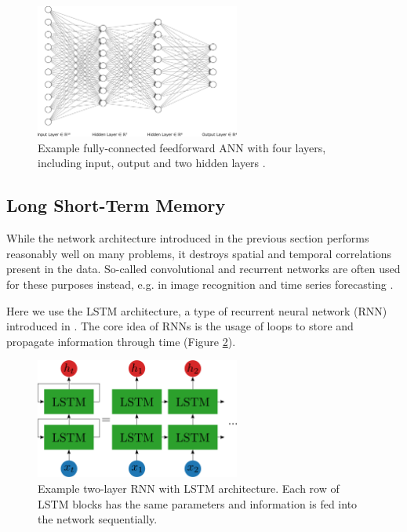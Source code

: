 \begin{figure}
	\centering
	\includegraphics[width=0.6\textwidth]{img/nn}
	\caption{Example fully-connected feedforward ANN with four layers, including input, output and two hidden layers \cite{LeNail2019}.}
	\label{nn}
\end{figure}

\subsection{Long Short-Term Memory}
While the network architecture introduced in the previous section performs reasonably well on many problems, it destroys spatial and temporal correlations present in the data. 
So-called convolutional and recurrent networks are often used for these purposes instead, e.g. in image recognition and time series forecasting \cite{rumelhart1986learning, 10.1007/978-3-642-46466-9_18}.

Here we use the LSTM architecture, a type of recurrent neural network (RNN) introduced in \cite{doi:10.1162/neco.1997.9.8.1735}. 
The core idea of RNNs is the usage of loops to store and propagate information through time (Figure \ref{rnn}).

\begin{figure}
	\centering
	\includegraphics[width=0.6\textwidth]{img/rnn}
	\caption{Example two-layer RNN with LSTM architecture. Each row of LSTM blocks has the same parameters and information is fed into the network sequentially.}
	\label{rnn}
\end{figure}

